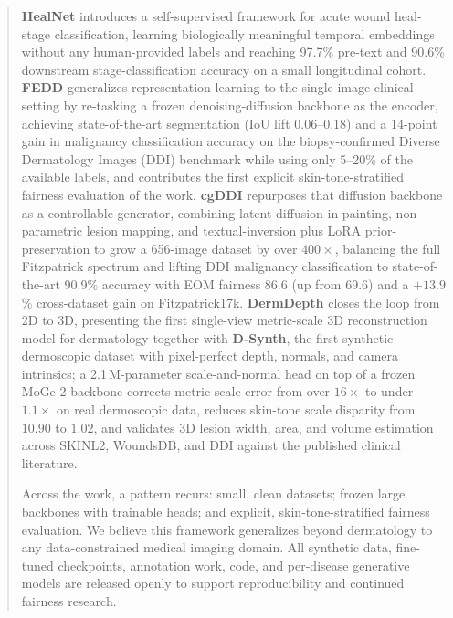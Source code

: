 \documentclass[11pt]{ucthesis}
\begin{document}
\begin{frontmatter}
\begin{abstract}
\textbf{HealNet} introduces a self-supervised framework for acute wound heal-stage classification, learning biologically meaningful temporal embeddings without any human-provided labels and reaching 97.7\% pre-text and 90.6\% downstream stage-classification accuracy on a small longitudinal cohort. \textbf{FEDD} generalizes representation learning to the single-image clinical setting by re-tasking a frozen denoising-diffusion backbone as the encoder, achieving state-of-the-art segmentation (IoU lift 0.06--0.18) and a 14-point gain in malignancy classification accuracy on the biopsy-confirmed Diverse Dermatology Images (DDI) benchmark while using only 5--20\% of the available labels, and contributes the first explicit skin-tone-stratified fairness evaluation of the work. \textbf{cgDDI} repurposes that diffusion backbone as a controllable generator, combining latent-diffusion in-painting, non-parametric lesion mapping, and textual-inversion plus LoRA prior-preservation to grow a 656-image dataset by over $400\times$, balancing the full Fitzpatrick spectrum and lifting DDI malignancy classification to state-of-the-art 90.9\% accuracy with EOM fairness 86.6 (up from 69.6) and a $+13.9$\% cross-dataset gain on Fitzpatrick17k. \textbf{DermDepth} closes the loop from 2D to 3D, presenting the first single-view metric-scale 3D reconstruction model for dermatology together with \textbf{D-Synth}, the first synthetic dermoscopic dataset with pixel-perfect depth, normals, and camera intrinsics; a 2.1\,M-parameter scale-and-normal head on top of a frozen MoGe-2 backbone corrects metric scale error from over $16\times$ to under $1.1\times$ on real dermoscopic data, reduces skin-tone scale disparity from $10.90$ to $1.02$, and validates 3D lesion width, area, and volume estimation across SKINL2, WoundsDB, and DDI against the published clinical literature.

Across the work, a pattern recurs: small, clean datasets; frozen large backbones with trainable heads; and explicit, skin-tone-stratified fairness evaluation. We believe this framework generalizes beyond dermatology to any data-constrained medical imaging domain. All synthetic data, fine-tuned checkpoints, annotation work, code, and per-disease generative models are released openly to support reproducibility and continued fairness research.
\end{abstract}


\end{frontmatter}
\end{document}
